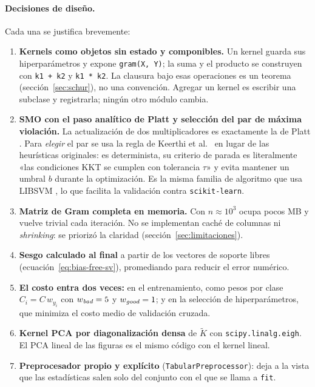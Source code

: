 \documentclass[11pt,a4paper]{article}
\newcommand{\Kc}{\widetilde{K}}                   %
\newcommand{\good}{\emph{good}}
\newcommand{\bad}{\emph{bad}}
\newcommand{\code}[1]{\texttt{#1}}
\theoremstyle{plain}
\theoremstyle{definition}
\theoremstyle{remark}
\numberwithin{equation}{section}
\begin{document}
\paragraph{Decisiones de diseño.} Cada una se justifica brevemente:
\begin{enumerate}
  \item \textbf{Kernels como objetos sin estado y componibles.} Un kernel guarda sus
        hiperparámetros y expone \code{gram(X, Y)}; la suma y el producto se construyen con
        \code{k1 + k2} y \code{k1 * k2}. La clausura bajo esas operaciones es un teorema
        (sección~\ref{sec:schur}), no una convención. Agregar un kernel es escribir una
        subclase y registrarla; ningún otro módulo cambia.
  \item \textbf{SMO con el paso analítico de Platt y selección del par de máxima violación.}
        La actualización de dos multiplicadores es exactamente la de Platt
        \cite{platt1998}. Para \emph{elegir} el par se usa la regla de Keerthi et
        al.~\cite{keerthi2001} en lugar de las heurísticas originales: es determinista, su
        criterio de parada es literalmente «las condiciones KKT se cumplen con tolerancia
        $\tau$» y evita mantener un umbral $b$ durante la optimización. Es la misma familia
        de algoritmo que usa LIBSVM \cite{libsvm}, lo que facilita la validación contra
        \code{scikit-learn}.
  \item \textbf{Matriz de Gram completa en memoria.} Con $n\approx 10^3$ ocupa pocos MB y
        vuelve trivial cada iteración. No se implementan caché de columnas ni
        \emph{shrinking}: se priorizó la claridad (sección~\ref{sec:limitaciones}).
  \item \textbf{Sesgo calculado al final} a partir de los vectores de soporte libres
        (ecuación~\eqref{eq:bias-free-sv}), promediando para reducir el error numérico.
  \item \textbf{El costo entra dos veces:} en el entrenamiento, como pesos por clase
        $C_i=C\,w_{y_i}$ con $w_{\bad}=\ResCostFN$ y $w_{\good}=\ResCostFP$; y en la
        selección de hiperparámetros, que minimiza el costo medio de validación cruzada.
  \item \textbf{Kernel PCA por diagonalización densa} de $\Kc$ con \code{scipy.linalg.eigh}.
        El PCA lineal de las figuras es el mismo código con el kernel lineal.
  \item \textbf{Preprocesador propio y explícito} (\code{TabularPreprocessor}): deja a la
        vista que las estadísticas salen solo del conjunto con el que se llama a \code{fit}.

\end{enumerate}
\end{document}

